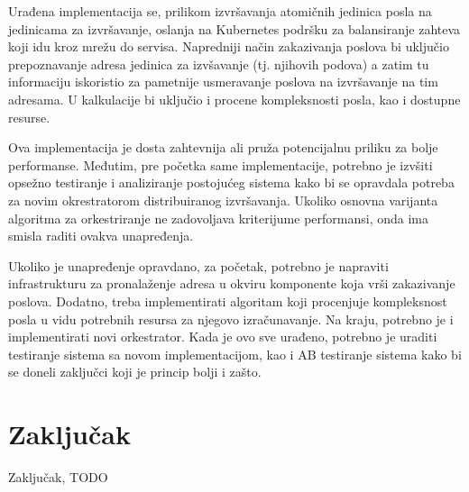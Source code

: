 \documentclass[12pt,oneside]{memoir}
\begin{document}
Urađena implementacija se, prilikom izvršavanja atomičnih jedinica posla na jedinicama za izvršavanje, oslanja na Kubernetes podršku za balansiranje zahteva koji idu kroz mrežu do servisa. Napredniji način zakazivanja poslova bi uključio prepoznavanje adresa jedinica za izvšavanje (tj. njihovih podova) a zatim tu informaciju iskoristio za pametnije usmeravanje poslova na izvršavanje na tim adresama. U kalkulacije bi uključio i procene kompleksnosti posla, kao i dostupne resurse.

Ova implementacija je dosta zahtevnija ali pruža potencijalnu priliku za bolje performanse. Međutim, pre početka same implementacije, potrebno je izvšiti opsežno testiranje i analiziranje postojućeg sistema kako bi se opravdala potreba za novim okrestratorom distribuiranog izvršavanja. Ukoliko osnovna varijanta algoritma za orkestriranje ne zadovoljava kriterijume performansi, onda ima smisla raditi ovakva unapređenja.

Ukoliko je unapređenje opravdano, za početak, potrebno je napraviti infrastrukturu za pronalaženje adresa u okviru komponente koja vrši zakazivanje poslova. Dodatno, treba implementirati algoritam koji procenjuje kompleksnost posla u vidu potrebnih resursa za njegovo izračunavanje. Na kraju, potrebno je i implementirati novi orkestrator. Kada je ovo sve urađeno, potrebno je uraditi testiranje sistema sa novom implementacijom, kao i AB testiranje sistema kako bi se doneli zaključci koji je princip bolji i zašto.


\section{Zaključak}
Zaključak, TODO

\literatura

\backmatter
\end{document}
